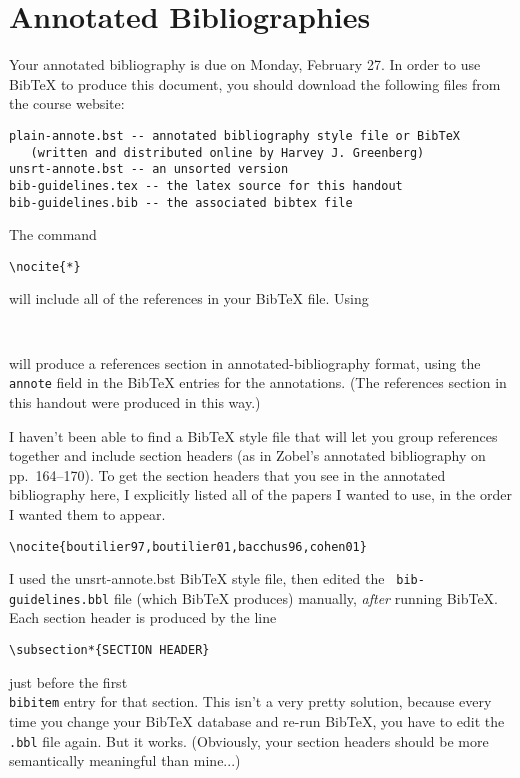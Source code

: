 \documentclass{article}
\begin{document}
\section{Annotated Bibliographies}

Your annotated bibliography is due on Monday, February 27.  In order to use
BibTeX to produce this document, you should download the following files
from the course website:
\begin{verbatim}
plain-annote.bst -- annotated bibliography style file or BibTeX 
   (written and distributed online by Harvey J. Greenberg)
unsrt-annote.bst -- an unsorted version
bib-guidelines.tex -- the latex source for this handout
bib-guidelines.bib -- the associated bibtex file
\end{verbatim}

The command
\begin{verbatim}
\nocite{*}
\end{verbatim}
will include all of the references in your BibTeX file.  Using
\begin{verbatim}


\end{verbatim}
will produce a references section in annotated-bibliography format,
using the {\tt annote} field in the BibTeX entries for the
annotations.  (The references section in this handout were produced in
this way.)

I haven't been able to find a BibTeX style file that will let you
group references together and include section headers (as in Zobel's
annotated bibliography on pp.~164--170).  To get the section headers
that you see in the annotated bibliography here, I explicitly listed
all of the papers I wanted to use, in the order I wanted them to
appear.
\begin{verbatim}
\nocite{boutilier97,boutilier01,bacchus96,cohen01}
\end{verbatim}
I used the
{unsrt-annote.bst} BibTeX style file, then edited the {\tt
bib-guidelines.bbl} file (which BibTeX produces) manually, {\em after}
running BibTeX.  Each section header is produced by the line
\begin{verbatim}
\subsection*{SECTION HEADER}
\end{verbatim}
just before the first {\tt \\bibitem} entry for that section.
This isn't a very pretty solution, because every time you change your
BibTeX database and re-run BibTeX, you have to edit the {\tt .bbl}
file again.  But it works.  (Obviously, your section headers should be
more semantically meaningful than mine...)


\nocite{boutilier97,boutilier01,bacchus96,cohen01}



\end{document}

